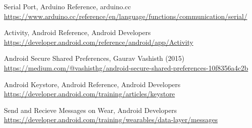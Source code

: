 \begin{thebibliography}{99}
Serial Port, Arduino Reference, arduino.cc\\
\url{https://www.arduino.cc/reference/en/language/functions/communication/serial/}

Activity, Android Reference, Android Developers\\
\url{https://developer.android.com/reference/android/app/Activity}

Android Secure Shared Preferences, Gaurav Vashisth (2015)\\
\url{https://medium.com/@vashisthg/android-secure-shared-preferences-10f8356a4c2b}

Android Keystore, Android Reference, Android Developers\\
\url{https://developer.android.com/training/articles/keystore}

Send and Recieve Messages on Wear, Android Developers\\
\url{https://developer.android.com/training/wearables/data-layer/messages}

\end{thebibliography}